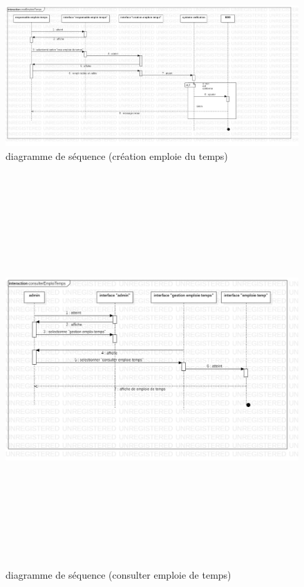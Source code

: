 \documentclass[english,12pt,a4paper]{report}
\begin{document}
\begin{figure}[h]
	\centering
	\includegraphics*[height=0.3 \textheight]{creeEmploieTempSequence.jpg}
	\caption{diagramme de séquence (création emploie du temps)}
	\label{fig6:diagramme de séquence (cree emploie du temps)}
\end{figure}
\begin{figure}[h]
	\centering
	\includegraphics*[height=15cm, width=15cm]{consulterEmploiTempSequence.jpg}
	\caption{diagramme de séquence (consulter emploie de temps)}
	\label{fig7:diagramme de séquence (consulter emploie de temps)}
\end{figure}
\end{document}
